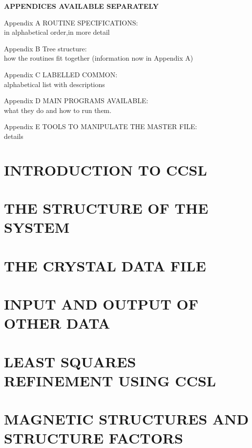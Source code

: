 \documentclass[onecolumn,twoside,12pt,a4paper]{report}
\begin{document}
{\tableofcontents
\p
\begin{center}\large\bfseries APPENDICES AVAILABLE SEPARATELY\end{center}
\vspace {0.5ex}
\begin{list}{}{\setlength{\leftmargin}{40mm}
               \setlength{\labelwidth}{\leftmargin}
               \addtolength{\leftmargin}{\labelsep}}

\item[Appendix A\hfill]ROUTINE SPECIFICATIONS:\\
 in alphabetical order,in more detail
\item[Appendix B\hfill]Tree structure:\\ how the routines fit together (information now in Appendix A)
\item[Appendix C\hfill]LABELLED COMMON:\\
 alphabetical list with descriptions
\item[Appendix D\hfill] MAIN PROGRAMS AVAILABLE:\\
 what they do and how to run them.
\item[Appendix E\hfill]TOOLS TO MANIPULATE THE MASTER FILE:\\
details
\end{list}
}
\chapter[Chapter 1]{INTRODUCTION TO CCSL}
\chapter[Chapter 2]{THE STRUCTURE OF THE SYSTEM}
\chapter[Chapter 3]{THE CRYSTAL DATA FILE}
\chapter[Chapter 4]{INPUT AND OUTPUT OF OTHER DATA}
\chapter[Chapter 5]{LEAST SQUARES REFINEMENT USING CCSL}
\chapter[Chapter 6]{MAGNETIC STRUCTURES AND STRUCTURE FACTORS}
\end{document}
